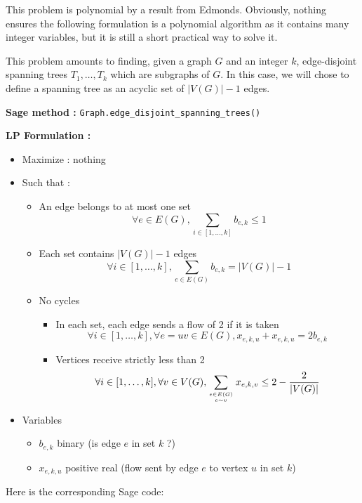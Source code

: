 This problem is polynomial by a result from Edmonds. Obviously, nothing ensures the following formulation is a polynomial algorithm as it contains many integer variables, but it is still a short practical way to solve it.

This problem amounts to finding, given a graph $G$ and an integer $k$, edge-disjoint spanning trees $T_1, \dots, T_k$ which are subgraphs of $G$. In this case, we will chose to define a spanning tree as an acyclic set of $|V(G)|-1$ edges.

{\bf Sage method : }\verb!Graph.edge_disjoint_spanning_trees()!

{\bf LP Formulation :}
\begin{itemize}
\item Maximize : nothing
\item Such that :
  \begin{itemize}
  \item An edge belongs to at most one set
    $$\forall e\in E(G), \sum_{i\in [1,\dots,k]} b_{e,k} \leq 1$$
  \item Each set contains $|V(G)|-1$ edges
    $$\forall i\in [1,\dots,k], \sum_{e\in E(G)} b_{e,k} = |V(G)|-1$$
  \item No cycles
    \begin{itemize}
    \item In each set, each edge sends a flow of 2 if it is taken
      $$\forall i\in [1,\dots,k], \forall e=uv\in E(G), x_{e,k,u} + x_{e,k,u} = 2b_{e,k}$$
    \item Vertices receive strictly less than 2
      $$\forall i\in [1,\dots,k], \forall v\in V(G), \sum_{e\in E(G)\atop e\sim v}x_{e,k,v}\leq 2-\frac 2 {|V(G)|}$$
    \end{itemize}
  \end{itemize}
\item Variables
  \begin{itemize}
  \item $b_{e,k}$ binary (is edge $e$ in set $k$ ?)
  \item $ x_{e,k,u}$ positive real (flow sent by edge $e$ to vertex $u$ in set $k$)
  \end{itemize}
\end{itemize}

Here is the corresponding Sage code:

